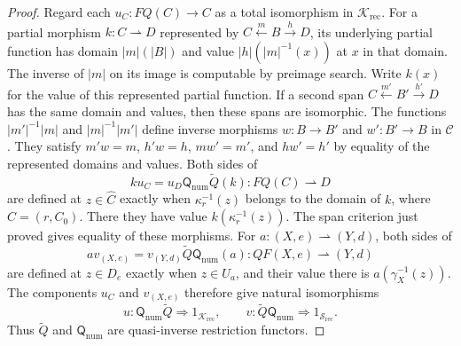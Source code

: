 \begin{proof}
Regard each $u_C:FQ(C)\to C$ as a total isomorphism in
$\mathcal K_{\mathrm{rec}}$. For a partial morphism $k:C\rightharpoonup D$
represented by $C\xleftarrow{m}B\xrightarrow{h}D$, its underlying
partial function has domain $|m|(|B|)$ and value
$|h|(|m|^{-1}(x))$ at $x$ in that domain. The inverse of $|m|$
on its image is computable by preimage search. Write $k(x)$ for
the value of this represented partial function. If a second span
$C\xleftarrow{m'}B'\xrightarrow{h'}D$ has the same domain and values,
then these spans are isomorphic. The functions $|m'|^{-1}|m|$ and $|m|^{-1}|m'|$
define inverse morphisms $w:B\to B'$ and $w':B'\to B$ in
$\mathcal C$. They satisfy $m'w=m$, $h'w=h$, $mw'=m'$, and
$hw'=h'$ by equality of the represented domains and values.
Both sides of
\[
 k u_C=u_D\mathsf Q_{\mathrm{num}}\widetilde Q(k)
       :FQ(C)\rightharpoonup D
\]
are defined at $z\in\widehat C$ exactly when
$\kappa_r^{-1}(z)$ belongs to the domain of $k$, where $C=(r,C_0)$.
There they have value $k(\kappa_r^{-1}(z))$. The span criterion
just proved gives equality of these morphisms.
For $a:(X,e)\rightharpoonup(Y,d)$, both sides of
\[
 a v_{(X,e)}
   =v_{(Y,d)}\widetilde Q\mathsf Q_{\mathrm{num}}(a)
   :QF(X,e)\rightharpoonup(Y,d)
\]
are defined at $z\in D_e$ exactly when $z\in U_a$, and their
value there is $a(\gamma_X^{-1}(z))$.
The components $u_C$ and $v_{(X,e)}$ therefore give natural
isomorphisms
\[
 u:\mathsf Q_{\mathrm{num}}\widetilde Q
             \Rightarrow1_{\mathcal K_{\mathrm{rec}}},\qquad
 v:\widetilde Q\mathsf Q_{\mathrm{num}}
             \Rightarrow1_{\mathscr S_{\mathrm{rec}}}.
\]
Thus $\widetilde Q$ and $\mathsf Q_{\mathrm{num}}$ are
quasi-inverse restriction functors.
\end{proof}

